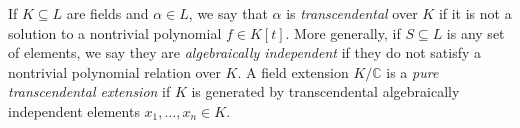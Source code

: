 If \( K \subseteq L \) are fields and \( \alpha \in L \), we say that \( \alpha \) is \emph{transcendental} over \( K \) if it is not a solution to a nontrivial polynomial \( f \in K[t] \).
More generally, if \( S \subseteq L \) is any set of elements, we say they are \emph{algebraically independent} if they do not satisfy a nontrivial polynomial relation over \( K \).
A field extension \( K / \mathbb C \) is a \emph{pure transcendental extension} if \( K \) is generated by transcendental algebraically independent elements \( x_1, \dots, x_n \in K \).
